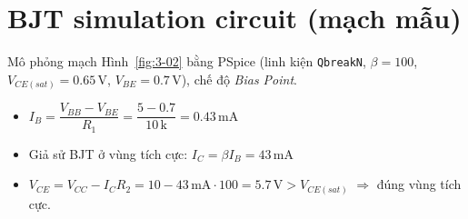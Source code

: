 \section*{BJT simulation circuit (mạch mẫu)}
Mô phỏng mạch Hình~\ref{fig:3-02} bằng PSpice (linh kiện \texttt{QbreakN}, $\beta = 100$, $V_{CE(sat)} = 0.65\,\text{V}$, $V_{BE} = 0.7\,\text{V}$), chế độ \textit{Bias Point}.


\simresult
{}

\begin{itemize}
  \item $I_B = \dfrac{V_{BB}-V_{BE}}{R_1} = \dfrac{5-0.7}{10\,\text{k}} = 0.43\,\text{mA}$
  \item Giả sử BJT ở vùng tích cực: $I_C = \beta I_B = 43\,\text{mA}$
  \item $V_{CE} = V_{CC} - I_C R_2 = 10 - 43\,\text{mA}\cdot 100 = 5.7\,\text{V} > V_{CE(sat)}$ $\Rightarrow$ đúng vùng tích cực.
\end{itemize}
